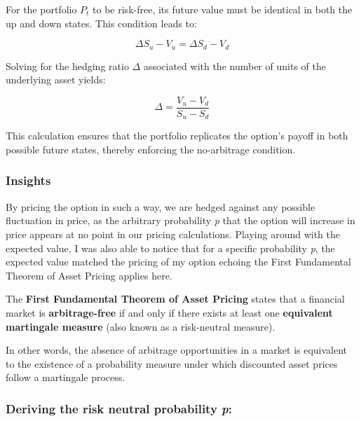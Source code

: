 \documentclass{article}
\begin{document}
    \medskip

    For the portfolio \( P_t \) to be risk-free, its future value must be identical in both the up and down states. This condition leads to:

    \[
        \Delta S_u - V_u = \Delta S_d - V_d
    \]

    Solving for the hedging ratio \( \Delta \) associated with the number of units of the underlying asset yields:

    \begin{equation}
        \label{eq:delta}
        \Delta = \frac{V_u - V_d}{S_u - S_d}
    \end{equation}

    This calculation ensures that the portfolio replicates the option's payoff in both possible future states, thereby enforcing the no-arbitrage condition.

    \subsubsection{Insights}

    By pricing the option in such a way, we are hedged against any possible fluctuation in price, as the arbitrary probability \emph{p} that the option will increase in price appears at no point in our pricing calculations.
    Playing around with the expected value, I was also able to notice that for a specific probability \emph{p}, the expected value matched the pricing of my option echoing the First Fundamental Theorem of Asset Pricing applies here.

    \begin{tcolorbox}[note, title=First Fundamental Theorem of Asset Pricing]
        The \textbf{First Fundamental Theorem of Asset Pricing} states that a financial market is \textbf{arbitrage-free} if and only if there exists at least one \textbf{equivalent martingale measure} (also known as a risk-neutral measure).

        In other words, the absence of arbitrage opportunities in a market is equivalent to the existence of a probability measure under which discounted asset prices follow a martingale process.
    \end{tcolorbox}

    \bigskip

    \subsubsection*{Deriving the risk neutral probability \emph{p}:}
\end{document}
